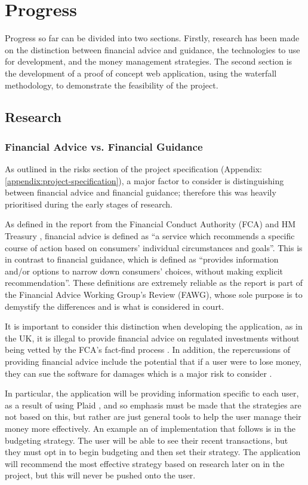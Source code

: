 \section{Progress} \label{sec:progress}
Progress so far can be divided into two sections. Firstly, research has been made on the distinction between financial advice and guidance, the technologies to use for development, and the money management strategies. The second section is the development of a proof of concept web application, using the waterfall methodology, to demonstrate the feasibility of the project.

\subsection{Research}
\subsubsection{Financial Advice vs. Financial Guidance}
As outlined in the risks section of the project specification (Appendix: \ref{appendix:project-specification}), a major factor to consider is distinguishing between financial advice and financial guidance; therefore this was heavily prioritised during the early stages of research.

As defined in the report from the Financial Conduct Authority (FCA) and HM Treasury \cite{FCAReport}, financial advice is defined as ``a service which recommends a specific course of action based on consumers' individual circumstances and goals''. This is in contrast to financial guidance, which is defined as ``provides information and/or options to narrow down consumers' choices, without making explicit recommendation''. These definitions are extremely reliable as the report is part of the Financial Advice Working Group's Review (FAWG), whose sole purpose is to demystify the differences and is what is considered in court.

It is important to consider this distinction when developing the application, as in the UK, it is illegal to provide financial advice on regulated investments without being vetted by the FCA's fact-find process \cite{FinancialAdviceLegalities}. In addition, the repercussions of providing financial advice include the potential that if a user were to lose money, they can sue the software for damages which is a major risk to consider \cite{SueBroker}. 

In particular, the application will be providing information specific to each user, as a result of using Plaid \cite{Plaid}, and so emphasis must be made that the strategies are not based on this, but rather are just general tools to help the user manage their money more effectively. An example an of implementation that follows is in the budgeting strategy. The user will be able to see their recent transactions, but they must opt in to begin budgeting and then set their strategy. The application will recommend the most effective strategy based on research later on in the project, but this will never be pushed onto the user.


